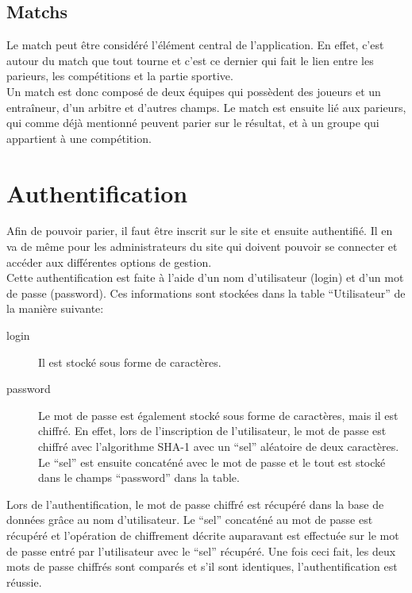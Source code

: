 \documentclass[10pt,a4paper,titlepage]{article}
\begin{document}
\subsection{Matchs}
Le match peut être considéré l'élément central de l'application. En effet, c'est autour du match que tout tourne et c'est ce dernier qui fait le lien entre les parieurs, les compétitions et la partie sportive.\\

Un match est donc composé de deux équipes qui possèdent des joueurs et un entraîneur, d'un arbitre et d'autres champs. Le match est ensuite lié aux parieurs, qui comme déjà mentionné peuvent parier sur le résultat, et à un groupe qui appartient à une compétition.

\section{Authentification}
Afin de pouvoir parier, il faut être inscrit sur le site et ensuite authentifié. Il en va de même pour les administrateurs du site qui doivent pouvoir se connecter et accéder aux différentes options de gestion.\\

Cette authentification est faite à l'aide d'un nom d'utilisateur (login) et d'un mot de passe (password). Ces informations sont stockées dans la table “Utilisateur” de la manière suivante:
\begin{description}
	\item [login] {Il est stocké sous forme de caractères.}
	\item [password] {Le mot de passe est également stocké sous forme de caractères, mais il est chiffré. En effet, lors de l'inscription de l'utilisateur, le mot de passe est chiffré avec l'algorithme SHA-1 avec un “sel” aléatoire de deux caractères. Le “sel” est ensuite concaténé avec le mot de passe et le tout est stocké dans le champs “password” dans la table.\\}
\end{description}

Lors de l'authentification, le mot de passe chiffré est récupéré dans la base de données grâce au nom d'utilisateur. Le “sel” concaténé au mot de passe est récupéré et l'opération de chiffrement décrite auparavant est effectuée sur le mot de passe entré par l'utilisateur avec le “sel” récupéré. Une fois ceci fait, les deux mots de passe chiffrés sont comparés et s'il sont identiques, l'authentification est réussie.\\
\end{document}
